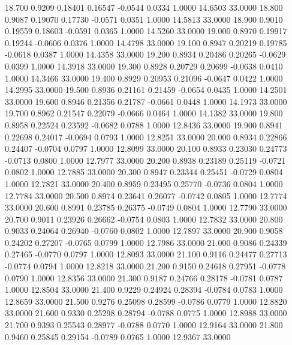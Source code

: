   18.700   0.9209   0.18401   0.16547  -0.0544   0.0334   1.0000  14.6503  33.0000
  18.800   0.9087   0.19070   0.17730  -0.0571   0.0351   1.0000  14.5813  33.0000
  18.900   0.9010   0.19559   0.18603  -0.0591   0.0365   1.0000  14.5260  33.0000
  19.000   0.8970   0.19917   0.19244  -0.0606   0.0376   1.0000  14.4798  33.0000
  19.100   0.8947   0.20219   0.19785  -0.0618   0.0387   1.0000  14.4358  33.0000
  19.200   0.8934   0.20486   0.20265  -0.0629   0.0399   1.0000  14.3918  33.0000
  19.300   0.8928   0.20729   0.20699  -0.0638   0.0410   1.0000  14.3466  33.0000
  19.400   0.8929   0.20953   0.21096  -0.0647   0.0422   1.0000  14.2995  33.0000
  19.500   0.8936   0.21161   0.21459  -0.0654   0.0435   1.0000  14.2501  33.0000
  19.600   0.8946   0.21356   0.21787  -0.0661   0.0448   1.0000  14.1973  33.0000
  19.700   0.8962   0.21547   0.22079  -0.0666   0.0464   1.0000  14.1382  33.0000
  19.800   0.8958   0.22524   0.23592  -0.0682   0.0788   1.0000  12.8436  33.0000
  19.900   0.8941   0.22698   0.24017  -0.0694   0.0793   1.0000  12.8251  33.0000
  20.000   0.8934   0.22866   0.24407  -0.0704   0.0797   1.0000  12.8099  33.0000
  20.100   0.8933   0.23030   0.24773  -0.0713   0.0800   1.0000  12.7977  33.0000
  20.200   0.8938   0.23189   0.25119  -0.0721   0.0802   1.0000  12.7885  33.0000
  20.300   0.8947   0.23344   0.25451  -0.0729   0.0804   1.0000  12.7821  33.0000
  20.400   0.8959   0.23495   0.25770  -0.0736   0.0804   1.0000  12.7784  33.0000
  20.500   0.8974   0.23641   0.26077  -0.0742   0.0805   1.0000  12.7774  33.0000
  20.600   0.8991   0.23785   0.26375  -0.0749   0.0804   1.0000  12.7790  33.0000
  20.700   0.9011   0.23926   0.26662  -0.0754   0.0803   1.0000  12.7832  33.0000
  20.800   0.9033   0.24064   0.26940  -0.0760   0.0802   1.0000  12.7897  33.0000
  20.900   0.9058   0.24202   0.27207  -0.0765   0.0799   1.0000  12.7986  33.0000
  21.000   0.9086   0.24339   0.27465  -0.0770   0.0797   1.0000  12.8093  33.0000
  21.100   0.9116   0.24477   0.27713  -0.0774   0.0794   1.0000  12.8218  33.0000
  21.200   0.9150   0.24618   0.27951  -0.0778   0.0790   1.0000  12.8356  33.0000
  21.300   0.9187   0.24766   0.28178  -0.0781   0.0787   1.0000  12.8504  33.0000
  21.400   0.9229   0.24924   0.28394  -0.0784   0.0783   1.0000  12.8659  33.0000
  21.500   0.9276   0.25098   0.28599  -0.0786   0.0779   1.0000  12.8820  33.0000
  21.600   0.9330   0.25298   0.28794  -0.0788   0.0775   1.0000  12.8988  33.0000
  21.700   0.9393   0.25543   0.28977  -0.0788   0.0770   1.0000  12.9164  33.0000
  21.800   0.9460   0.25845   0.29154  -0.0789   0.0765   1.0000  12.9367  33.0000
